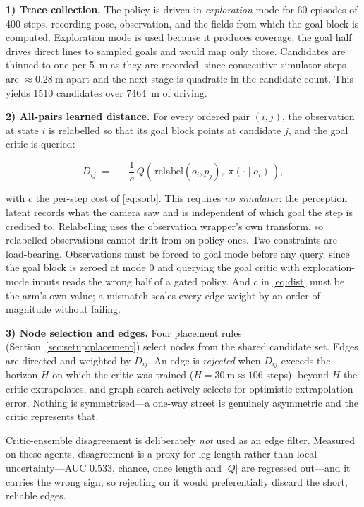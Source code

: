 \textbf{1) Trace collection.} The policy is driven in \emph{exploration} mode
for \num{60} episodes of \num{400} steps, recording pose, observation, and the
fields from which the goal block is computed. Exploration mode is used because
it produces coverage; the goal half drives direct lines to sampled goals and
would map only those. Candidates are thinned to one per \SI{5}{\meter} as they
are recorded, since consecutive simulator steps are $\approx\!\SI{0.28}{\meter}$
apart and the next stage is quadratic in the candidate count. This yields
\num{1510} candidates over \SI{7464}{\meter} of driving.

\textbf{2) All-pairs learned distance.} For every ordered pair $(i,j)$, the
observation at state $i$ is relabelled so that its goal block points at
candidate $j$, and the goal critic is queried:

\begin{equation}
\label{eq:dist}
  D_{ij} \;=\; -\,\frac{1}{c}\,
  Q\!\left(\,\mathrm{relabel}(o_i, p_j),\; \pi(\cdot \mid o_i)\,\right),
\end{equation}

with $c$ the per-step cost of \eqref{eq:sorb}. This requires \emph{no
simulator}: the perception latent records what the camera saw and is independent
of which goal the step is credited to. Relabelling uses the observation
wrapper's own transform, so relabelled observations cannot drift from on-policy
ones. Two constraints are load-bearing. Observations must be forced to goal mode
before any query, since the goal block is zeroed at mode $0$ and querying the
goal critic with exploration-mode inputs reads the wrong half of a gated policy.
And $c$ in \eqref{eq:dist} must be the arm's own value; a mismatch scales every
edge weight by an order of magnitude without failing.

\textbf{3) Node selection and edges.} Four placement rules
(Section~\ref{sec:setup:placement}) select nodes from the shared candidate set.
Edges are directed and weighted by $D_{ij}$. An edge is \emph{rejected} when
$D_{ij}$ exceeds the horizon $H$ on which the critic was trained
($H = \SI{30}{\meter} \approx 106$ steps): beyond $H$ the critic extrapolates,
and graph search actively selects for optimistic extrapolation error. Nothing is
symmetrised---a one-way street is genuinely asymmetric and the critic represents
that.

Critic-ensemble disagreement is deliberately \emph{not} used as an edge filter.
Measured on these agents, disagreement is a proxy for leg length rather than
local uncertainty---AUC \num{0.533}, chance, once length and $|Q|$ are regressed
out---and it carries the wrong sign, so rejecting on it would preferentially
discard the short, reliable edges.


